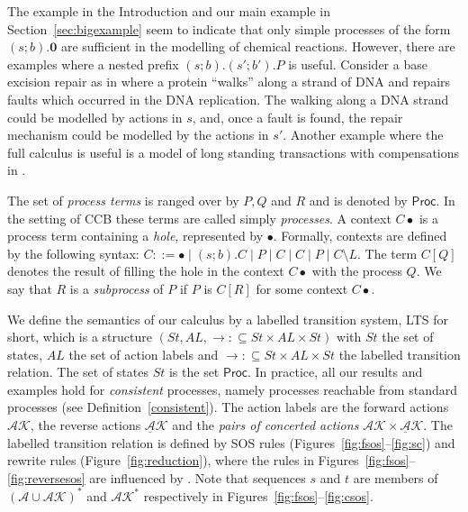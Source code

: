 \documentclass[review]{elsarticle}
\newcommand{\paral}{\; \vert \;}
\newcommand{\Proc}{\mathsf{Proc}}
\newcommand{\restrict}[1]{\!\setminus\!#1}
\newcommand{\mAK}{\mathcal{AK}}
\newcommand{\umAK}{\underline{\mathcal{A}}\mathcal{K}}
\newcommand{\Nil}{\mathbf{0}}
\newcommand{\hole}{\bullet}
\begin{document}
%
%
The example in the Introduction and our main example in Section~\ref{sec:bigexample} seem to indicate that only
simple processes of the form $(s;b).\Nil$ are sufficient in the modelling of chemical reactions. 
However, there are examples where a nested prefix $(s;b).(s';b').P$ is useful. 
Consider a base excision repair as in \cite{Koehler2014} where a protein ``walks'' along 
a strand of DNA and repairs faults which occurred in the DNA replication. The walking along a DNA strand 
could be modelled by actions in $s$, and, once a fault is found, the repair mechanism could be modelled
by the actions in $s'$. Another example where the full calculus is useful is a model of long 
standing transactions with compensations in \cite{Irek2012}.


The set of \emph{process terms} is ranged over by $P,Q$ and $R$ and is denoted by $\Proc$. 
In the setting of CCB these terms are called simply \emph{processes}. 
A context $C\hole$ is a process term containing a \emph{hole}, represented by $\hole$. 
Formally, contexts are defined by
the following syntax: $C::= \hole \mid (s;b).C \mid P\paral C \mid C \paral P \mid C\restrict L $.
The term $C[Q]$ denotes the result of filling the hole in the context $C\hole$ with the process $Q$.
We say that $R$ is a \emph{subprocess} of $P$ if $P$ is $C[R]$ for some context $C\hole$.

We define the semantics of our calculus by a labelled transition system,
LTS for short, which is a structure $(St,AL,\rightarrow: \subseteq St \times AL \times St)$
with $St$ the set of states, $AL$ the set of action labels and $\rightarrow: 
\subseteq St \times AL \times St$ the labelled transition relation.
The set of states $St$ is the set $\Proc$. In practice, all our results and examples hold for
\emph{consistent} processes, namely processes
reachable from standard processes (see Definition~\ref{consistent}). 
The action labels are the forward actions $\mAK$, 
the reverse actions $\umAK$ and the \emph{pairs of concerted actions} $\mAK \times \umAK$. 
%
The labelled transition relation is defined by SOS rules (Figures~\ref{fig:fsos}--\ref{fig:sc}) 
and rewrite rules (Figure~\ref{fig:reduction}), where
the rules in Figures~\ref{fig:fsos}--\ref{fig:reversesos}
are influenced by \cite{Irek2007}. 
Note that
sequences $s$ and $t$ are members of $(\mathcal{A}\cup\mathcal{AK})^*$ and $\mathcal{AK}^*$
respectively in Figures~\ref{fig:fsos}--\ref{fig:csos}.
\end{document}
